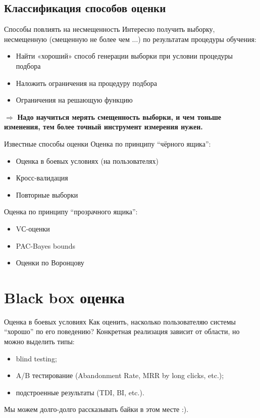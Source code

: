 \documentclass[14pt, fleqn, xcolor={dvipsnames, table}]{beamer}
\begin{document}
\subsection{Классификация способов оценки}
\begin{frame}{Способы повлиять на несмещенность}
Интересно получить выборку, несмещенную (смещенную не более чем $\ldots$) по результатам процедуры обучения:
\begin{itemize}
 \item Найти «хороший» способ генерации выборки при условии процедуры подбора
 \item Наложить ограничения на процедуру подбора
 \item Ограничения на решающую функцию
\end{itemize}
$\Rightarrow$ \textbf{Надо научиться мерять смещенность выборки, и чем тоньше изменения, тем более точный инструмент измерения нужен.}
\end{frame}

\begin{frame}{Известные способы оценки}
Оценка по принципу ``чёрного ящика'':
\begin{itemize}
  \item Оценка в боевых условиях (на пользователях)
  \item Кросс-валидация
  \item Повторные выборки
\end{itemize}
Оценка по принципу ``прозрачного ящика'':
\begin{itemize}
  \item VС-оценки
  \item PAC-Bayes bounds
  \item Оценки по Воронцову
\end{itemize}
\end{frame}

\section{Black box оценка}
\begin{frame}{Оценка в боевых условиях}
Как оценить, насколько пользователяю системы ``хорошо'' по его поведению?
Конкретная реализация зависит от области, но можно выделить типы:
\begin{itemize}
\item blind testing;
\item A/B тестирование (Abandonment Rate, MRR by long clicks, etc.);
\item подстроенные результаты (TDI, BI, etc.).
\end{itemize}
\footnotesize Мы можем долго-долго рассказывать байки в этом месте :).
\end{frame}
\end{document}
